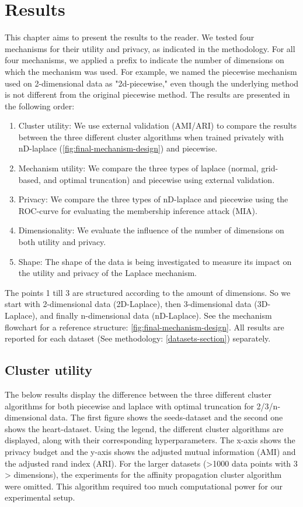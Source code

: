 \chapter{Results}
This chapter aims to present the results to the reader.
We tested four mechanisms for their utility and privacy, as indicated in the methodology.
For all four mechanisms, we applied a prefix to indicate the number of dimensions on which the mechanism was used.
For example, we named the piecewise mechanism used on 2-dimensional data as "2d-piecewise," even though the underlying method is not different from the original piecewise method.
The results are presented in the following order:
\begin{enumerate}
    \item Cluster utility: We use external validation (AMI/ARI) to compare the results between the three different cluster algorithms when trained privately with nD-laplace (\ref{fig:final-mechanism-design}) and piecewise.
    \item Mechanism utility: We compare the three types of laplace (normal, grid-based, and optimal truncation) and piecewise using external validation.
    \item Privacy: We compare the three types of nD-laplace and piecewise using the ROC-curve for evaluating the membership inference attack (MIA).
    \item Dimensionality: We evaluate the influence of the number of dimensions on both utility and privacy. 
    \item Shape: The shape of the data is being investigated to measure its impact on the utility and privacy of the Laplace mechanism. 
\end{enumerate}
The points 1 till 3 are structured according to the amount of dimensions. So we start with 2-dimensional data (2D-Laplace), then 3-dimensional data (3D-Laplace), and finally n-dimensional data (nD-Laplace). See the mechanism flowchart for a reference structure: \ref{fig:final-mechanism-design}.
All results are reported for each dataset (See methodology: \ref{datasets-section}) separately.
\newpage
\section{Cluster utility}
The below results display the difference between the three different cluster algorithms for both piecewise and laplace with optimal truncation for 2/3/n-dimensional data.
The first figure shows the seeds-dataset and the second one shows the heart-dataset. \newline
Using the legend, the different cluster algorithms are displayed, along with their corresponding hyperparameters.
The x-axis shows the privacy budget and the y-axis shows the adjusted mutual information (AMI) and the adjusted rand index (ARI).
For the larger datasets (>1000 data points with 3 > dimensions), the experiments for the affinity propagation cluster algorithm were omitted.
This algorithm required too much computational power for our experimental setup.

